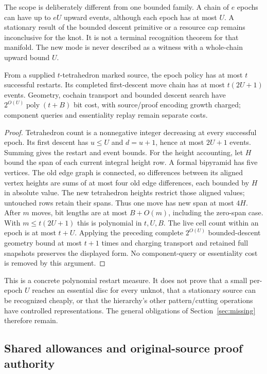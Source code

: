 The scope is deliberately different from one bounded family. A chain of
$e$ epochs can have up to $eU$ upward events, although each epoch has at
most $U$. A stationary result of the bounded descent primitive or a resource
cap remains inconclusive for the knot. It is not a terminal recognition
theorem for that manifold. The new mode is never described as a witness
with a whole-chain upward bound $U$.

\begin{proposition}
From a supplied $t$-tetrahedron marked source, the epoch policy has at most
$t$ successful restarts. Its completed first-descent move chain has at most
$t(2U+1)$ events. Geometry, cochain transport and bounded descent search have
$2^{O(U)}\operatorname{poly}(t+B)$ bit cost, with source/proof encoding growth
charged; component queries and essentiality replay remain separate costs.
\end{proposition}
\begin{proof}
Tetrahedron count is a nonnegative integer decreasing at every successful
epoch. Its first descent has $u\le U$ and $d=u+1$, hence at most $2U+1$
events. Summing gives the restart and event bounds.
For the height accounting, let $H$ bound the span of each current integral
height row. A formal bipyramid has five vertices. The old edge graph is
connected, so differences between its aligned vertex heights are sums of
at most four old edge differences, each bounded by $H$ in absolute value.
The new tetrahedron heights restrict those aligned values; untouched rows
retain their spans. Thus one move has new span at most $4H$.
After $m$ moves, bit lengths are at most $B+O(m)$, including the zero-span
case. With $m\le t(2U+1)$ this is polynomial in $t,U,B$. The live cell count
within an epoch is at most $t+U$. Applying the preceding complete
$2^{O(U)}$ bounded-descent geometry bound at most $t+1$ times and charging
transport and retained full snapshots preserves the displayed form.
No component-query or essentiality cost is removed by this argument.
\end{proof}

This is a concrete polynomial restart measure. It does not prove that a
small per-epoch $U$ reaches an essential disc for every unknot, that a
stationary source can be recognized cheaply, or that the hierarchy's other
pattern/cutting operations have controlled representations. The general
obligations of Section~\ref{sec:missing} therefore remain.

\subsection{Shared allowances and original-source proof authority}

